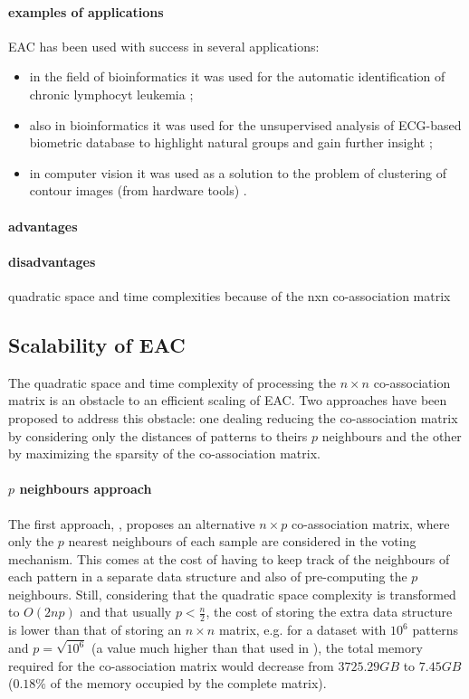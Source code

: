 \paragraph{examples of applications}

EAC has been used with success in several applications:
\begin{itemize}
	\item in the field of bioinformatics it was used for the automatic identification of chronic lymphocyt leukemia \cite{Qian2010};
	\item also in bioinformatics it was used for the unsupervised analysis of ECG-based biometric database to highlight natural groups and gain further insight \cite{Lourenco2009};
	\item in computer vision it was used as a solution to the problem of clustering of contour images (from hardware tools) \cite{Lourenco2007}.
\end{itemize}



\paragraph{advantages}

\paragraph{disadvantages}
quadratic space and time complexities because of the nxn co-association matrix 


\subsection{Scalability of EAC} 
The quadratic space and time complexity of processing the $n \times n$ co-association matrix is an obstacle to an efficient scaling of EAC. Two approaches have been proposed to address this obstacle: one dealing reducing the co-association matrix by considering only the distances of patterns to theirs $p$ neighbours and the other by maximizing the sparsity of the co-association matrix.

\paragraph{$p$ neighbours approach}
The first approach, \cite{Fred2005}, proposes an alternative $n \times p$ co-association matrix, where only the $p$ nearest neighbours of each sample are considered in the voting mechanism. This comes at the cost of having to keep track of the neighbours of each pattern in a separate data structure and also of pre-computing the $p$ neighbours. Still, considering that the quadratic space complexity is transformed to $O(2np)$ and that usually $p < \frac{n}{2}$, the cost of storing the extra data structure is lower than that of storing an $n \times n$ matrix, e.g. for a dataset with $10^6$ patterns and $p=\sqrt{10^6}$ (a value much higher than that used in \cite{Fred2005}), the total memory required for the co-association matrix would decrease from $3725.29 GB$ to $7.45 GB$ ($0.18\%$ of the memory occupied by the complete matrix).

